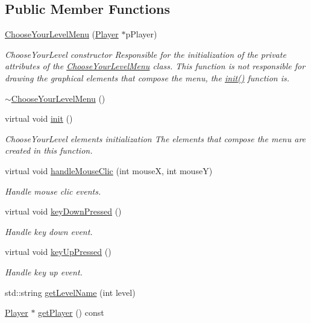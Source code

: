 \subsection*{Public Member Functions}
\begin{DoxyCompactItemize}
\item 
\hyperlink{class_symp_1_1_choose_your_level_menu_a98ee0f524c03693196a26a733cc49c3b}{Choose\-Your\-Level\-Menu} (\hyperlink{class_symp_1_1_player}{Player} $\ast$p\-Player)
\begin{DoxyCompactList}\small\item\em Choose\-Your\-Level constructor Responsible for the initialization of the private attributes of the \hyperlink{class_symp_1_1_choose_your_level_menu_a98ee0f524c03693196a26a733cc49c3b}{Choose\-Your\-Level\-Menu} class. This function is not responsible for drawing the graphical elements that compose the menu, the \hyperlink{class_symp_1_1_choose_your_level_menu_a18c2d2aec31b070ecdd5ec8d2c8b4cbf}{init()} function is. \end{DoxyCompactList}\item 
\hyperlink{class_symp_1_1_choose_your_level_menu_af744c7af3ef5a5b3011b441539c3743f}{$\sim$\-Choose\-Your\-Level\-Menu} ()
\item 
virtual void \hyperlink{class_symp_1_1_choose_your_level_menu_a18c2d2aec31b070ecdd5ec8d2c8b4cbf}{init} ()
\begin{DoxyCompactList}\small\item\em Choose\-Your\-Level elements initialization The elements that compose the menu are created in this function. \end{DoxyCompactList}\item 
virtual void \hyperlink{class_symp_1_1_choose_your_level_menu_a8c3ad10284b68e12df75ff980a7fc657}{handle\-Mouse\-Clic} (int mouse\-X, int mouse\-Y)
\begin{DoxyCompactList}\small\item\em Handle mouse clic events. \end{DoxyCompactList}\item 
virtual void \hyperlink{class_symp_1_1_choose_your_level_menu_a2a66e7d44ceca790b987eca33fa478ff}{key\-Down\-Pressed} ()
\begin{DoxyCompactList}\small\item\em Handle key down event. \end{DoxyCompactList}\item 
virtual void \hyperlink{class_symp_1_1_choose_your_level_menu_a59974b0d10b806ed646569b4b658d68f}{key\-Up\-Pressed} ()
\begin{DoxyCompactList}\small\item\em Handle key up event. \end{DoxyCompactList}\item 
std\-::string \hyperlink{class_symp_1_1_choose_your_level_menu_a2702263ebb7be3e86a62dadfc0f098cd}{get\-Level\-Name} (int level)
\item 
\hyperlink{class_symp_1_1_player}{Player} $\ast$ \hyperlink{class_symp_1_1_choose_your_level_menu_a4b0cc48f521c2f315e2b5995a6a0b3f8}{get\-Player} () const 
\end{DoxyCompactItemize}


